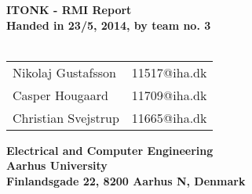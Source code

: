 
\begin{titlepage}
\begin{center}
{\LARGE \textbf{ITONK - RMI Report}}\\


\vspace{4cm}
\textbf{Handed in 23/5, 2014, by team no. 3}\\~\\
\begin{tabular}{ll}
Nikolaj Gustafsson  & 11517@iha.dk \\
Casper Hougaard  & 11709@iha.dk \\
Christian Svejstrup  & 11665@iha.dk \\
\end{tabular}
\vfill
\textbf{Electrical and Computer Engineering}\\
\textbf{Aarhus University}\\
\textbf{Finlandsgade 22, 8200 Aarhus N, Denmark}
\end{center}
\end{titlepage}